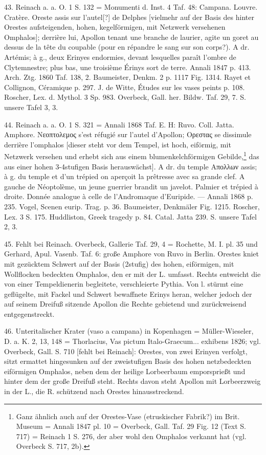 \documentclass[a4paper, 11pt, oneside]{article}
\begin{document}
43. Reinach a. a. O. 1 S. 132 = Monumenti d. Inst. 4 Taf. 48: Campana. Louvre. Cratère. Oreste assis sur l'autel[?] de Delphes [vielmehr auf der Basis des hinter Orestes aufsteigenden, hohen, kegelförmigen, mit Netzwerk versehenen Omphalos]; derrière lui, Apollon tenant une branche de laurier, agite un goret au dessus de la tête du coupable (pour en répandre le sang sur son corps?). A dr. Artémis; à g., deux Erinyes endormies, devant lesquelles paraît l'ombre de Clytemnestre; plus bas, une troisième Érinys sort de terre. Annali 1847 p. 413. Arch. Ztg. 1860 Taf. 138, 2. Baumeister, Denkm. 2 p. 1117 Fig. 1314. Rayet et Collignon, Céramique p. 297. J. de Witte, Études sur les vases peints p. 108. Roscher, Lex. d. Mythol. 3 Sp. 983. Overbeck, Gall. her. Bildw. Taf. 29, 7. S. unsere Tafel 3, 3.

44. Reinach a. a. O. 1 S. 321 = Annali 1868 Taf. E. H: Ruvo. Coll. Jatta. Amphore. Νεοπτολεμος s'est réfugié sur l'autel d'Apollon; Ορεστας se dissimule derrière l'omphalos [dieser steht vor dem Tempel, ist hoch, eiförmig, mit Netzwerk versehen und erhebt sich aus einem blumenkelchförmigen Gebilde,\footnote{Ganz ähnlich auch auf der Orestes-Vase (etruskischer Fabrik?) im Brit. Museum = Annali 1847 pl. 10 = Overbeck, Gall. Taf. 29 Fig. 12 (Text S. 717) = Reinach 1 S. 276, der aber wohl den Omphalos verkannt hat (vgl. Overbeck S. 717, 2b).} das aus einer hohen 3-4stufigen Basis herauswächst]. A dr. du temple Απολλων assis; à g. du temple et d'un trépied on aperçoit la prêtresse avec sa grande clef. A gauche de Néoptolème, un jeune guerrier brandit un javelot. Palmier et trépied à droite. Donnée analogue à celle de l'Andromaque d'Euripide. --- Annali 1868 p. 235. Vogel, Scenen eurip. Trag. p. 36. Baumeister, Denkmäler Fig. 1215. Roscher, Lex. 3 S. 175. Huddliston, Greek tragedy p. 84. Catal. Jatta 239. S. unsere Tafel 2, 3.

45. Fehlt bei Reinach. Overbeck, Gallerie Taf. 29, 4 = Rochette, M. I. pl. 35 und Gerhard, Apul. Vasenb. Taf. 6: große Amphore von Ruvo in Berlin. Orestes kniet mit gezücktem Schwert auf der Basis (2stufig) des hohen, eiförmigen, mit Wollflocken bedeckten Omphalos, den er mit der L. umfasst. Rechts entweicht die von einer Tempeldienerin begleitete, verschleierte Pythia. Von l. stürmt eine geflügelte, mit Fackel und Schwert bewaffnete Erinys heran, welcher jedoch der auf seinem Dreifuß sitzende Apollon die Rechte gebietend und zurückweisend entgegenstreckt.

46. Unteritalischer Krater (vaso a campana) in Kopenhagen = Müller-Wieseler, D. a. K. 2, 13, 148 = Thorlacius, Vas pictum Italo-Graecum... exhibens 1826; vgl. Overbeck, Gall. S. 710 [fehlt bei Reinach]: Orestes, von zwei Erinyen verfolgt, sitzt ermattet hingesunken auf der zweistufigen Basis des hohen netzbedeckten eiförmigen Omphalos, neben dem der heilige Lorbeerbaum emporsprießt und hinter dem der große Dreifuß steht. Rechts davon steht Apollon mit Lorbeerzweig in der L., die R. schützend nach Orestes hinausstreckend.
\end{document}

